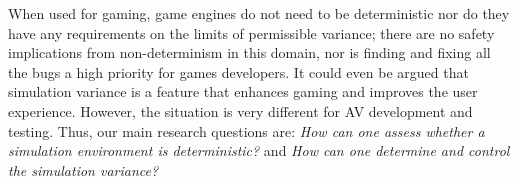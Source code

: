 \documentclass[runningheads,twocolumn,a4paper,10pt]{llncs}
\begin{document}
When used for gaming, game engines do not need to be deterministic nor do they have any requirements on the limits of permissible variance; there are no safety implications from non-determinism in this domain, nor is finding and fixing all the bugs %
a high priority for games developers. It could even be argued that simulation variance is a feature that enhances gaming and improves the user experience. However, the situation is very different for AV development and testing. Thus, our main research questions are:
%
%
{\em How can one assess whether a simulation environment is deterministic?} and 
{\em How can one determine and control the simulation variance?}






\end{document}
